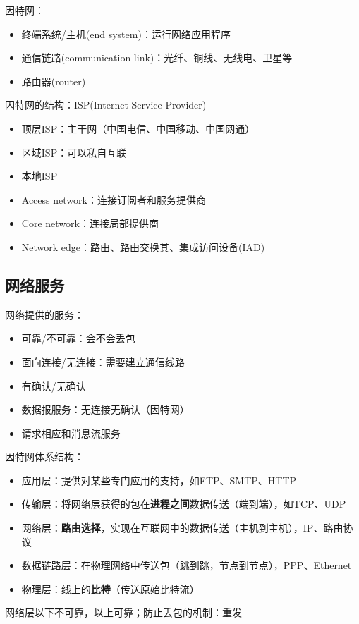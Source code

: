 因特网：
\begin{itemize}
	\item 终端系统/主机(end system)：运行网络应用程序
	\item 通信链路(communication link)：光纤、铜线、无线电、卫星等
	\item 路由器(router)
\end{itemize}

因特网的结构：ISP(Internet Service Provider)
\begin{itemize}
	\item 顶层ISP：主干网（中国电信、中国移动、中国网通）
	\item 区域ISP：可以私自互联
	\item 本地ISP
\end{itemize}

\begin{itemize}
	\item Access network：连接订阅者和服务提供商
	\item Core network：连接局部提供商
	\item Network edge：路由、路由交换其、集成访问设备(IAD)
\end{itemize}

\subsection{网络服务}
网络提供的服务：
\begin{itemize}
	\item 可靠/不可靠：会不会丢包
	\item 面向连接/无连接：需要建立通信线路
	\item 有确认/无确认
	\item 数据报服务：无连接无确认（因特网）
	\item 请求相应和消息流服务
\end{itemize}

因特网体系结构：
\begin{itemize}
	\item 应用层：提供对某些专门应用的支持，如FTP、SMTP、HTTP
	\item 传输层：将网络层获得的包在\textbf{进程之间}数据传送（端到端），如TCP、UDP
	\item 网络层：\textbf{路由选择}，实现在互联网中的数据传送（主机到主机），IP、路由协议
	\item 数据链路层：在物理网络中传送包（跳到跳，节点到节点），PPP、Ethernet
	\item 物理层：线上的\textbf{比特}（传送原始比特流）
\end{itemize}
网络层以下不可靠，以上可靠；防止丢包的机制：重发

